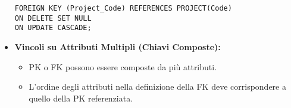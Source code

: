 \begin{itemize}
		\begin{verbatim}
FOREIGN KEY (Project_Code) REFERENCES PROJECT(Code)
ON DELETE SET NULL
ON UPDATE CASCADE;
		\end{verbatim}
		\item \textbf{Vincoli su Attributi Multipli (Chiavi Composte):}
		\begin{itemize}
			\item PK o FK possono essere composte da più attributi.
			\item L'ordine degli attributi nella definizione della FK deve corrispondere a quello della PK referenziata.
		\end{itemize}
	\end{itemize}
	

